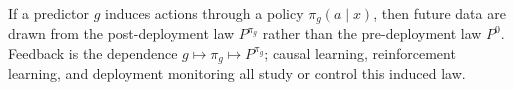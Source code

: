 \begin{remark} \label{rem:sl-feedback-policy-learning} \\
If a predictor $g$ induces actions through a policy $\pi_g(a\mid x)$, then future data are drawn from the post-deployment law $P^{\pi_g}$ rather than the pre-deployment law $P^0$. Feedback is the dependence $g\mapsto\pi_g\mapsto P^{\pi_g}$; causal learning, reinforcement learning, and deployment monitoring all study or control this induced law.
\end{remark}
